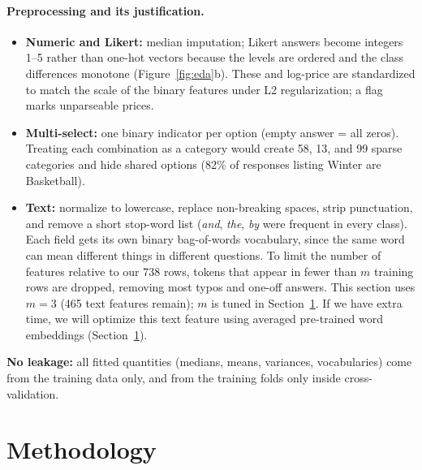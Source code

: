 \documentclass[11pt,titlepage]{article}
\begin{document}
\paragraph{Preprocessing and its justification.}
\begin{itemize}\itemsep0pt
\item \textbf{Numeric and Likert:} median imputation; Likert answers become
integers 1--5 rather than one-hot vectors because the levels are ordered and the
class differences monotone (Figure~\ref{fig:eda}b). These and log-price are
standardized to match the scale of the binary features under L2 regularization; a
flag marks unparseable prices.
\item \textbf{Multi-select:} one binary indicator per option (empty answer = all
zeros). Treating each combination as a category would create 58, 13, and 99 sparse
categories and hide shared options (82\% of responses listing Winter are
Basketball).
\item \textbf{Text:} normalize to lowercase, replace non-breaking spaces, strip punctuation, and
remove a short stop-word list (\emph{and}, \emph{the}, \emph{by} were frequent in
every class). Each field gets its own binary bag-of-words vocabulary, since the same
word can mean different things in different questions. To limit the number of
features relative to our 738 rows, tokens that appear in fewer than $m$ training
rows are dropped, removing most typos and one-off answers. This section uses
$m = 3$ (465 text features remain); $m$ is tuned in Section~\ref{sec:methodology}.
If we have extra time, we will optimize this text feature using averaged pre-trained word
embeddings (Section~\ref{sec:methodology}).

\end{itemize}
\textbf{No leakage:} all fitted quantities (medians, means, variances,
vocabularies) come from the training data only, and from the training folds only
inside cross-validation.

\section{Methodology}\label{sec:methodology}
\end{document}
